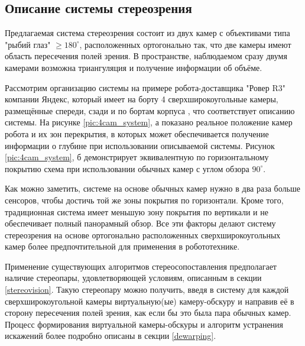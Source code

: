 \subsection{Описание системы стереозрения}

Предлагаемая система стереозрения состоит из двух камер с объективами типа "рыбий глаз" $\geqslant180^\circ$,
расположенных ортогонально так, что  две камеры имеют область пересечения полей зрения. В пространстве, наблюдаемом 
сразу  двумя камерами возможна триангуляция и получение информации об объёме.  %

Рассмотрим организацию системы на примере робота-доставщика "Ровер R3"  компании Яндекс, который имеет на борту 4 сверхширокоугольные камеры, 
размещённые спереди, сзади и по бортам корпуса \cite{yandex_rover}, что соответствует описанию системы. 
На рисунке \ref{pic:4cam_system}, а показано реальное положение камер  робота и их зон перекрытия, в которых может 
 обеспечивается получение информации о глубине при использовании описываемой системы. Рисунок \ref{pic:4cam_system}, б
демонстрирует эквивалентную по горизонтальному  покрытию схема при использовании обычных камер 
 с углом обзора $90^\circ$. 
 

Как можно заметить, системе на основе обычных камер нужно в два раза больше сенсоров, чтобы достичь той же зоны покрытия 
по горизонтали.  Кроме того, традиционная система имеет меньшую зону покрытия по вертикали и не обеспечивает полный 
панорамный обзор. Все эти факторы делают систему стереозрения на основе ортогонально расположенных сверхширокоугольных камер 
более предпочтительной для применения в робототехнике.  %

Применение существующих алгоритмов стереосопоставления предполагает наличие стереопары, удовлетворяющей условиям, описанным в секции \ref{stereovision}.
 Такую стереопару можно получить, введя в систему  для каждой сверхширокоугольной камеры виртуальную(ые) камеру-обскуру и направив 
её в сторону пересечения полей зрения, как если бы это была пара обычных камер. Процесс формирования виртуальной камеры-обскуры и 
алгоритм устранения искажений более подробно описаны в секции \ref{dewarping}.

